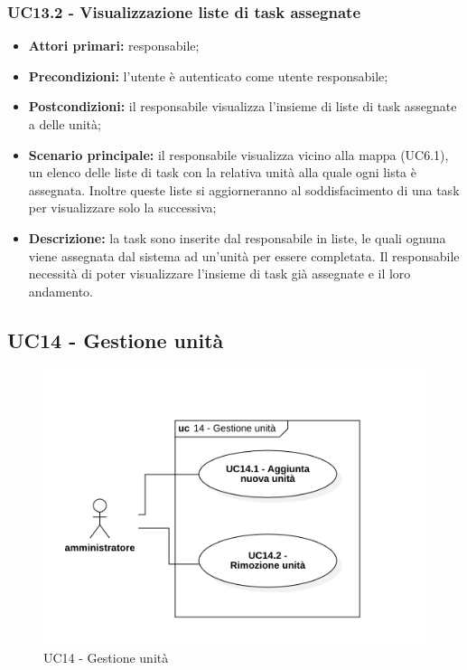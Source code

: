 \subsubsection{UC13.2 - Visualizzazione liste di task assegnate}
\begin{itemize}
	\item 	\textbf{Attori primari:} responsabile;
	\item 	\textbf{Precondizioni:} l'utente è autenticato come utente responsabile;
	\item 	\textbf{Postcondizioni:} il responsabile visualizza l'insieme di liste di task assegnate a delle unità;
	\item 	\textbf{Scenario principale:} il responsabile visualizza vicino alla mappa (UC6.1), un elenco delle liste di task con la relativa unità alla quale ogni lista è assegnata. Inoltre queste liste si aggiorneranno al soddisfacimento di una task per visualizzare solo la successiva;
	\item 	\textbf{Descrizione:} la task sono inserite dal responsabile in liste, le quali ognuna viene assegnata dal sistema ad un'unità per essere completata. Il responsabile necessità di poter visualizzare l'insieme di task già assegnate e il loro andamento.

\end{itemize}

\subsection{UC14 - Gestione unità}

\begin{figure}[H]
	\centering
	\includegraphics[scale=0.52]{res/images/uc14.png}
	\caption{UC14 - Gestione unità}
\end{figure}

